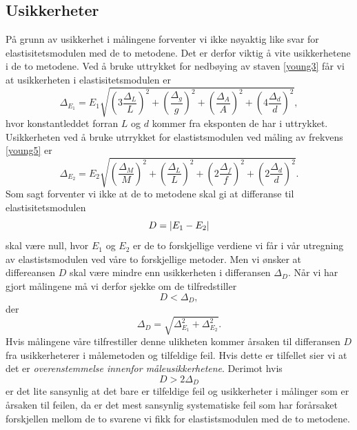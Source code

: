 \documentclass[%
 reprint,
 amsmath,amssymb,
 aps,
 norsk,
 booktabs
]{revtex4-1}
\begin{document}
\subsection{Usikkerheter}
På grunn av usikkerhet i målingene forventer vi ikke nøyaktig like svar for elastisitetsmodulen med de to metodene. Det er derfor viktig å vite usikkerhetene i de to metodene. Ved å bruke uttrykket for nedbøying av staven \eqref{young3} får vi at usikkerheten i elastisitetsmodulen er
\begingroup\makeatletter\def\f@size{7.5}\check@mathfonts
\begin{equation}
  \Delta_{E_1} = E_1 \sqrt{\left(3\frac{\Delta_L}{L}\right)^2+\left(\frac{\Delta_g}{g}\right)^2+\left(\frac{\Delta_A}{A}\right)^2+\left(4\frac{\Delta_d}{d}\right)^2},\label{uncertenty1}
\end{equation}
\endgroup
hvor konstantleddet forran $L$ og $d$ kommer fra eksponten de har i uttrykket.
Usikkerheten ved å bruke utrrykket for elastistsmodulen ved måling av frekvens \eqref{young5} er
\begingroup\makeatletter\def\f@size{7.5}\check@mathfonts
\begin{equation}
  \Delta_{E_2} = E_2 \sqrt{\left(\frac{\Delta_M}{M}\right)^2+\left(\frac{\Delta_L}{L}\right)^2+\left(2\frac{\Delta_f}{f}\right)^2+\left(2\frac{\Delta_d}{d}\right)^2}. \label{uncertenty2}
\end{equation}
\endgroup
Som sagt forventer vi ikke at de to metodene skal gi at differanse til elastisitetsmodulen $$D=\abs{E_1-E_2}$$ skal være null, hvor $E_1$ og $E_2$ er de to forskjellige verdiene vi får i vår utregning av elastistsmodulen ved våre to forskjellige metoder. Men vi ønsker at differeansen $D$ skal være mindre enn usikkerheten i differansen $\Delta_D$. Når vi har gjort målingene må vi derfor sjekke om de tilfredstiller
\begin{equation}
  D < \Delta_D, \label{usikk1}
\end{equation}
der
\begin{equation}
  \Delta_D = \sqrt{\Delta_{E_1}^2 + \Delta_{E_2}^2}. \label{usikk2}
\end{equation}
Hvis målingene våre tilfrestiller denne ulikheten kommer årsaken til differansen $D$ fra usikkerheterer i målemetoden og tilfeldige feil. Hvis dette er tilfellet sier vi at det er
\textit{overenstemmelse innenfor måleusikkerhetene}.
Derimot hvis
\begin{equation}
  D > 2\Delta_D
\end{equation}
er det lite sansynlig at det bare er tilfeldige feil og usikkerheter i målinger som er årsaken til feilen, da er det mest sansynlig systematiske feil som har forårsaket forskjellen mellom de to svarene vi fikk for elastistsmodulen med de to metodene.
\end{document}
